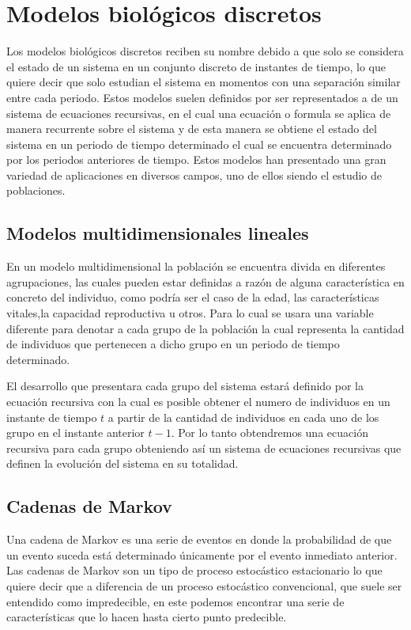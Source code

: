 \section{Modelos biológicos discretos} %
\label{sec:Modelos biologicos discretos}

Los modelos biológicos discretos reciben su nombre debido a que solo se considera el estado de un sistema en un conjunto discreto de instantes de tiempo, lo que quiere decir que solo estudian el sistema en momentos con una separación similar entre cada periodo.
Estos modelos suelen definidos por ser representados a 
de un sistema de ecuaciones recursivas, en el cual una ecuación o formula se aplica de manera recurrente sobre el sistema y de esta manera se obtiene el estado del sistema en un periodo de tiempo determinado el cual se encuentra determinado por los periodos anteriores de tiempo. Estos modelos han presentado una gran variedad de aplicaciones en diversos campos, uno de ellos siendo el estudio de poblaciones.

\subsection{Modelos multidimensionales lineales}

En un modelo multidimensional la población se encuentra divida en diferentes agrupaciones, las cuales pueden estar definidas a razón de alguna característica en concreto del individuo, como podría ser el caso de la edad, las características vitales,la capacidad reproductiva u otros. Para lo cual se usara una variable diferente para denotar a cada grupo de la población la cual representa la cantidad de individuos que pertenecen a dicho grupo en un periodo de tiempo determinado.

El desarrollo que presentara cada grupo del sistema estará definido por la ecuación recursiva con la cual es posible obtener el numero de individuos en un instante de tiempo $t$ a partir de la cantidad de individuos en cada uno de los grupo en el instante anterior $t-1$. Por lo tanto obtendremos una ecuación recursiva para cada grupo obteniendo así un sistema de ecuaciones recursivas que definen la evolución del sistema en su totalidad. 


\subsection{Cadenas de Markov} %
\label{sub:Cadenas de Markov}
Una cadena de Markov es una serie de eventos en donde la probabilidad de que un evento suceda está determinado únicamente por el evento inmediato anterior. Las cadenas de Markov son un tipo de proceso estocástico estacionario lo que quiere decir que a diferencia de un proceso estocástico convencional, que suele ser entendido como impredecible, en este podemos encontrar una serie de características que lo hacen hasta cierto punto predecible. 


